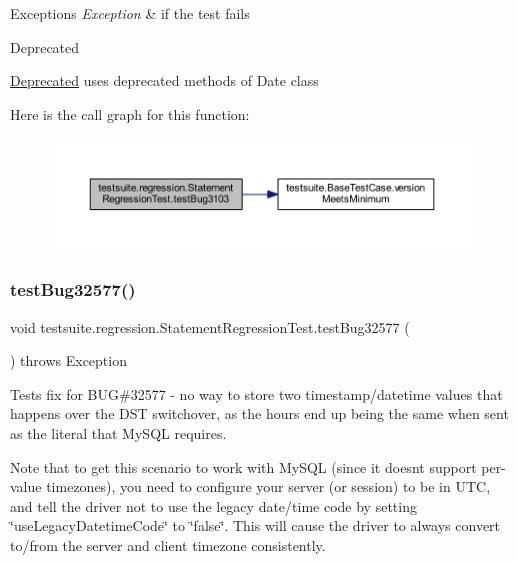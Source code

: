 \begin{DoxyExceptions}{Exceptions}
{\em Exception} & if the test fails\\
\hline
\end{DoxyExceptions}
\begin{DoxyRefDesc}{Deprecated}
\item[\mbox{\hyperlink{deprecated__deprecated000025}{Deprecated}}]uses deprecated methods of Date class \end{DoxyRefDesc}
Here is the call graph for this function\+:
\nopagebreak
\begin{figure}[H]
\begin{center}
\leavevmode
\includegraphics[width=350pt]{classtestsuite_1_1regression_1_1_statement_regression_test_a9c642be3e679b82dbf2a033e2f09e90b_cgraph}
\end{center}
\end{figure}
\mbox{\label{classtestsuite_1_1regression_1_1_statement_regression_test_a46c9677cc1878bfd4f5da911d30cac02}} 
\subsubsection{\texorpdfstring{test\+Bug32577()}{testBug32577()}}
{\footnotesize\ttfamily void testsuite.\+regression.\+Statement\+Regression\+Test.\+test\+Bug32577 (\begin{DoxyParamCaption}{ }\end{DoxyParamCaption}) throws Exception}

Tests fix for B\+UG\#32577 -\/ no way to store two timestamp/datetime values that happens over the D\+ST switchover, as the hours end up being the same when sent as the literal that My\+S\+QL requires.

Note that to get this scenario to work with My\+S\+QL (since it doesn\textquotesingle{}t support per-\/value timezones), you need to configure your server (or session) to be in U\+TC, and tell the driver not to use the legacy date/time code by setting \char`\"{}use\+Legacy\+Datetime\+Code\char`\"{} to \char`\"{}false\char`\"{}. This will cause the driver to always convert to/from the server and client timezone consistently.


